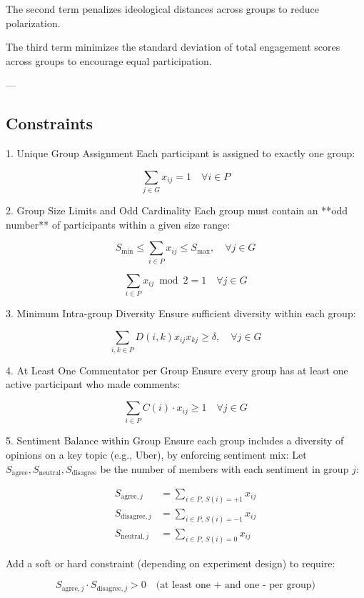 \documentclass[11pt,a4paper]{article}
\begin{document}
The second term penalizes ideological distances across groups to reduce polarization.

The third term minimizes the standard deviation of total engagement scores across groups to encourage equal participation.

---

\subsection{Constraints}

1. Unique Group Assignment
   Each participant is assigned to exactly one group:

$$
\sum_{j \in G} x_{ij} = 1 \quad \forall i \in P
$$

2. Group Size Limits and Odd Cardinality
   Each group must contain an **odd number** of participants within a given size range:

$$
S_{\min} \leq \sum_{i \in P} x_{ij} \leq S_{\max}, \quad \forall j \in G
$$

$$
\sum_{i \in P} x_{ij} \bmod 2 = 1 \quad \forall j \in G
$$

3. Minimum Intra-group Diversity
   Ensure sufficient diversity within each group:

$$
\sum_{i,k \in P} D(i,k) x_{ij} x_{kj} \geq \delta, \quad \forall j \in G
$$

4. At Least One Commentator per Group
   Ensure every group has at least one active participant who made comments:

$$
\sum_{i \in P} C(i) \cdot x_{ij} \geq 1 \quad \forall j \in G
$$

5. Sentiment Balance within Group
   Ensure each group includes a diversity of opinions on a key topic (e.g., Uber), by enforcing sentiment mix:
   Let $S_{\text{agree}}, S_{\text{neutral}}, S_{\text{disagree}}$ be the number of members with each sentiment in group $j$:

$$
\begin{aligned}
S_{\text{agree},j} &= \sum_{i \in P,\, S(i) = +1} x_{ij} \\
S_{\text{disagree},j} &= \sum_{i \in P,\, S(i) = -1} x_{ij} \\
S_{\text{neutral},j} &= \sum_{i \in P,\, S(i) = 0} x_{ij}
\end{aligned}
$$

Add a soft or hard constraint (depending on experiment design) to require:

$$
S_{\text{agree},j} \cdot S_{\text{disagree},j} > 0 \quad \text{(at least one + and one - per group)}
$$
\end{document}
